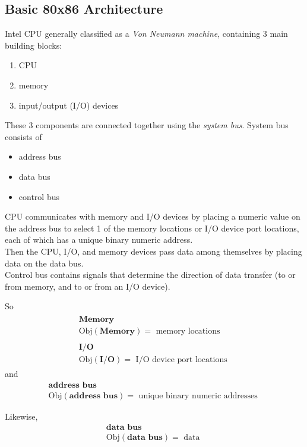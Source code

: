 \documentclass[10pt]{amsart}
\begin{document}
\subsection{Basic 80x86 Architecture}  

Intel CPU generally classified as a \emph{Von Neumann machine}, containing 3 main building blocks:
\begin{enumerate}
	\item CPU
	\item memory
	\item input/output (I/O) devices
\end{enumerate}
These 3 components are connected together using the \emph{system bus}.  System bus consists of 
\begin{itemize}
	\item address bus
	\item data bus
	\item control bus
\end{itemize}

CPU communicates with memory and I/O devices by placing a numeric value on the address bus to select 1 of the memory locations or I/O device port locations, each of which has a unique binary numeric address.   \\
Then the CPU, I/O, and memory devices pass data among themselves by placing data on the data bus.   \\
Control bus contains signals that determine the direction of data transfer (to or from memory, and to or from an I/O device).  

So 
\[
\begin{gathered}
\begin{gathered}
\textbf{Memory} \\
\text{Obj}{(\textbf{Memory})} = \text{ memory locations } 
\end{gathered} \\ 
\begin{gathered}
\textbf{I/O} \\
\text{Obj}{(\textbf{I/O})} = \text{ I/O device port locations } 
\end{gathered}
\end{gathered}
\]
and 
\[
\begin{gathered}
\textbf{address bus} \\
\text{Obj}{(\textbf{address bus})} = \text{ unique binary numeric addresses } 
\end{gathered}
\]

Likewise, 
\[
\begin{gathered}
\textbf{data bus} \\
\text{Obj}{(\textbf{data bus})} = \text{ data } 
\end{gathered}
\]
\end{document}
